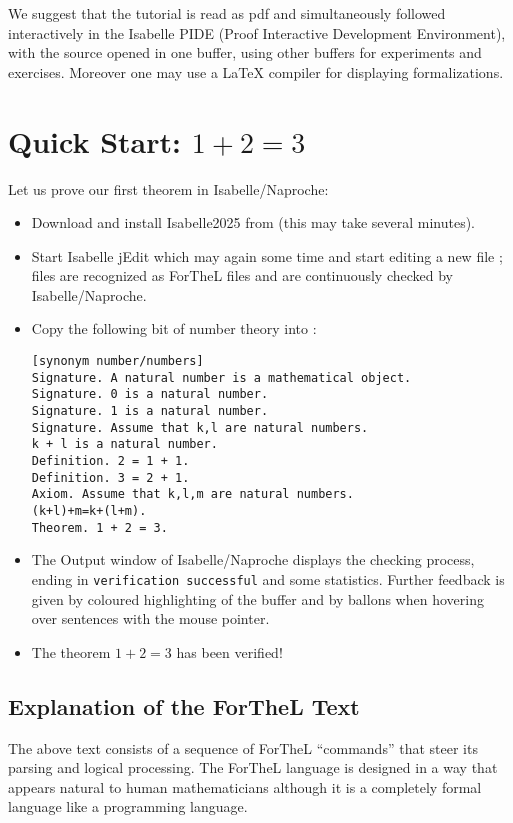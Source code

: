 \documentclass[11pt]{article}
\begin{document}
We suggest that the tutorial is read as pdf and simultaneously followed 
interactively in the Isabelle
PIDE (Proof Interactive Development Environment), with the source
 opened in one buffer, using other buffers
for experiments and exercises. Moreover one may use a \LaTeX{} compiler
for displaying  formalizations.

\section{Quick Start: $1 + 2 = 3$}

Let us prove our first theorem in Isabelle/Naproche:

\begin{itemize}
\item Download and install Isabelle2025 from
 (this may take several minutes).

\item Start Isabelle jEdit which may again some time and
start editing a new file ;  files are recognized
as ForTheL files and are continuously checked by Isabelle/Naproche.

\item Copy the following bit of number theory into :
\begin{verbatim}
[synonym number/numbers]
Signature. A natural number is a mathematical object.
Signature. 0 is a natural number.
Signature. 1 is a natural number.
Signature. Assume that k,l are natural numbers.
k + l is a natural number.
Definition. 2 = 1 + 1.
Definition. 3 = 2 + 1.
Axiom. Assume that k,l,m are natural numbers.
(k+l)+m=k+(l+m).
Theorem. 1 + 2 = 3.
\end{verbatim}

\item The Output window of Isabelle/Naproche displays the checking
process, ending in \verb+verification successful+ and
some statistics.
Further feedback is given by coloured highlighting of the buffer and by
ballons when hovering over sentences with the mouse pointer.

\item The theorem $1+2=3$ has been verified!
\end{itemize}

\subsection{Explanation of the ForTheL Text}
The above text consists of a sequence of ForTheL ``commands'' that steer its
parsing and logical processing. The ForTheL language is designed
in a way that appears natural to human mathematicians although it is a
completely formal language like a programming language.
\end{document}
